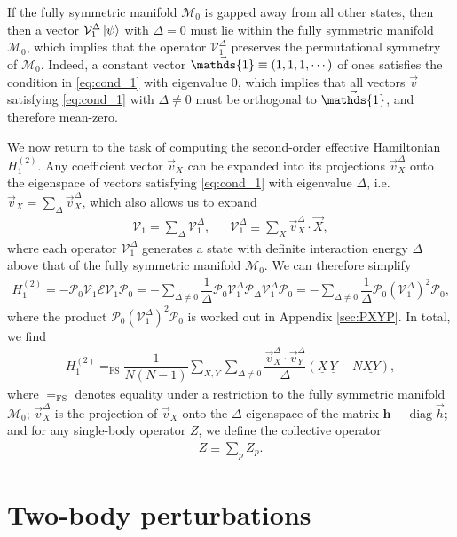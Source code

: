 \documentclass[nofootinbib,notitlepage,11pt]{revtex4-2}
\newcommand{\f}[2]{\dfrac{#1}{#2}} %
\newcommand{\p}[1]{\left(#1\right)} %
\renewcommand{\c}{\cdot} %
\newcommand{\m}{\bm} %
\renewcommand{\v}{\vec} %
\newcommand{\1}{\mathds{1}}
\newcommand{\E}{\mathcal{E}}
\newcommand{\M}{\mathcal{M}}
\renewcommand{\P}{\mathcal{P}}
\newcommand{\V}{\mathcal{V}}
\newcommand{\EQFS}{=_{\text{FS}}}
\newcommand{\col}{\underline}
\DeclareMathOperator{\diag}{diag}
\begin{document}
If the fully symmetric manifold $\M_0$ is gapped away from all other
states, then then a vector $\V_1^\Delta\ket\psi$ with $\Delta=0$ must
lie within the fully symmetric manifold $\M_0$, which implies that the
operator $\V_1^\Delta$ preserves the permutational symmetry of $\M_0$.
Indeed, a constant vector $\v\1\equiv\p{1,1,1,\cdots}$ of ones
satisfies the condition in \eqref{eq:cond_1} with eigenvalue $0$,
which implies that all vectors $\v v$ satisfying \eqref{eq:cond_1}
with $\Delta\ne0$ must be orthogonal to $\v\1$, and therefore
mean-zero.

We now return to the task of computing the second-order effective
Hamiltonian $H_1^{(2)}$.  Any coefficient vector $\v v_X$ can be
expanded into its projections $\v v_X^\Delta$ onto the eigenspace of
vectors satisfying \eqref{eq:cond_1} with eigenvalue $\Delta$,
i.e.~$\v v_X = \sum_\Delta \v v_X^\Delta$, which also allows us to
expand
\begin{align}
  \V_1 = \sum_\Delta \V_1^\Delta,
  &&
  \V_1^\Delta \equiv \sum_X \v v_X^\Delta \c \v X,
\end{align}
where each operator $\V_1^\Delta$ generates a state with definite
interaction energy $\Delta$ above that of the fully symmetric manifold
$\M_0$.  We can therefore simplify
\begin{align}
  H_1^{(2)}
  = - \P_0 \V_1 \E \V_1 \P_0
  = - \sum_{\Delta\ne0} \f1{\Delta}
  \P_0 \V_1^\Delta \P_\Delta \V_1^\Delta \P_0
  = - \sum_{\Delta\ne0} \f1{\Delta} \P_0 \p{\V_1^\Delta}^2 \P_0,
\end{align}
where the product $\P_0 \p{\V_1^\Delta}^2 \P_0$ is worked out in
Appendix \ref{sec:PXYP}.  In total, we find
\begin{align}
  H_1^{(2)}
  \EQFS \f1{N\p{N-1}} \sum_{X,Y} \sum_{\Delta\ne0}
  \f{\v v_X^\Delta\c\v v_Y^\Delta}{\Delta}
  \p{\col{X}\,\col{Y} - N \col{XY}},
  \label{eq:H_1_2}
\end{align}
where $\EQFS$ denotes equality under a restriction to the fully
symmetric manifold $\M_0$; $\v v_X^\Delta$ is the projection of
$\v v_X$ onto the $\Delta$-eigenspace of the matrix $\m h-\diag\v h$;
and for any single-body operator $Z$, we define the collective operator
\begin{align}
  \col{Z} \equiv \sum_p Z_p.
\end{align}

\section{Two-body perturbations}
\label{sec:two_body_pert}
\end{document}
